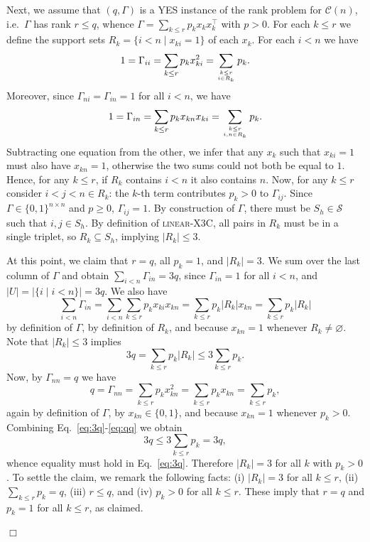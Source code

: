 \documentclass[envcountsect,envcountsame]{svjour3}
\theoremstyle{changebreak}                %
\newenvironment{proof}
 {{\sl Proof.}\hspace*{1 ex}}%
 {{\nopagebreak\hspace*{\fill}$\Box$\par\vspace{12pt}}}
\newcommand{\transpose}[1]{{#1}^{\top}}
\newcommand{\CONX}[1]{\mathcal{C}(#1)}
\begin{document}
\begin{proof}
  Next, we assume that $(q,\Gamma)$ is a YES instance of the rank problem for $\CONX{n}$, i.e.~$\Gamma$  has rank $r\le q$, whence $\Gamma=\sum_{k\le r} p_k x_k\transpose{x}_k$ with $p>0$. For each $k\le r$ we define the support sets $R_k=\{i<n\;|\;x_{ki}=1\}$ of each $x_k$. For each $i<n$ we have
  \begin{equation}
    1=\Gamma_{ii}=\sum_{k\le r} p_k x_{ki}^2=\sum_{k\le r\atop i\in R_k} p_k.
    \label{eq:ii}
  \end{equation}
  Moreover, since $\Gamma_{ni}=\Gamma_{in}=1$ for all $i<n$, we have
  \[1=\Gamma_{in}=\sum_{k\le r} p_k x_{kn}x_{ki}=\sum_{k\le r\atop i,n\in R_k} p_k.\]
  Subtracting one equation from the other, we infer that any $x_k$ such that $x_{ki}=1$ must also have $x_{kn}=1$, otherwise the two sums could not both  be equal to $1$. Hence, for any $k\le r$, if $R_k$ contains $i<n$ it also contains $n$. Now, for any $k\le r$ consider $i<j<n\in R_k$: the $k$-th term contributes $p_k>0$ to $\Gamma_{ij}$. Since $\Gamma\in\{0,1\}^{n\times n}$ and $p\ge 0$, $\Gamma_{ij}=1$. By construction of $\Gamma$, there must be $S_h\in\mathcal{S}$ such that $i,j\in S_h$. By definition of \textsc{linear}-X3C, all pairs in $R_k$ must be in a single triplet, so $R_k\subseteq S_h$, implying $|R_k|\le 3$.

  At this point, we claim that $r=q$, all $p_k=1$, and $|R_k|=3$. We sum over the last column of $\Gamma$ and obtain $\sum_{i<n}\Gamma_{in}=3q$, since $\Gamma_{in}=1$ for all $i<n$, and $|U|=|\{i\;|\;i<n\}|=3q$. We also have
  \[\sum_{i<n}\Gamma_{in}=\sum_{i<n}\sum_{k\le r}p_k x_{ki} x_{kn}=\sum_{k\le r}p_k|R_k| x_{kn}=\sum_{k\le r}p_k|R_k|\]
  by definition of $\Gamma$, by definition of $R_k$, and because $x_{kn}=1$ whenever $R_k\not=\varnothing$. Note that $|R_k|\le 3$ implies
  \begin{equation}
    3q = \sum_{k\le r} p_k|R_k|\le 3\sum_{k\le r}p_k.
    \label{eq:3q}
  \end{equation}
  Now, by $\Gamma_{nn}=q$ we have
  \begin{equation}
    q = \Gamma_{nn}=\sum_{k\le r} p_k x_{kn}^2 =\sum_{k\le r} p_k x_{kn}=\sum_{k\le r} p_k,
    \label{eq:qq}
  \end{equation}
  again by definition of $\Gamma$, by $x_{kn}\in\{0,1\}$, and because $x_{kn}=1$ whenever $p_k>0$. Combining Eq.~\eqref{eq:3q}-\eqref{eq:qq} we obtain
  \[3q\le 3\sum_{k\le r} p_k = 3q,\]
  whence equality must hold in Eq.~\eqref{eq:3q}. Therefore $|R_k|=3$ for all $k$ with $p_k>0$. To settle the claim, we remark the following facts: (i) $|R_k|=3$ for all $k\le r$, (ii) $\sum_{k\le r} p_k=q$, (iii) $r\le q$, and (iv) $p_k>0$ for all $k\le r$. These imply that $r=q$ and $p_k=1$ for all $k\le r$, as claimed.
  

\end{proof}
\end{document}
